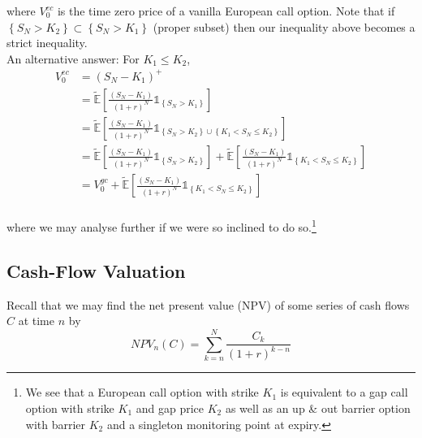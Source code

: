 \documentclass[12pt]{article}
\newlength\tindent
\renewcommand{\indent}{\hspace*{\tindent}}
\newcommand{\E}{\mathbb E}
\begin{document}
where $V^{ec}_0$ is the time zero price of a vanilla European call option. Note that if $\left\{S_N > K_2\right\} \subset \left\{S_N > K_1\right\}$ (proper subset) then our inequality above becomes a strict inequality. \\

An alternative answer: For $K_1 \leq K_2$,
\begin{align*}
	V^{ec}_0 &= (S_N - K_1)^+ \\
	&= \tilde{\E} \left[ \frac{(S_N - K_1)}{(1 + r)^N} \mathds 1_{\left\{S_N > K_1 \right\} } \right] \\
	&= \tilde{\E} \left[ \frac{(S_N - K_1)}{(1 + r)^N} \mathds 1_{\left\{S_N > K_2\right\} \cup \left\{ K_1 < S_N \leq K_2 \right\} } \right] \\
	&= \tilde{\E} \left[ \frac{(S_N - K_1)}{(1 + r)^N} \mathds 1_{\left\{S_N > K_2\right\}} \right] + \tilde{\E} \left[ \frac{(S_N - K_1)}{(1 + r)^N} \mathds 1_{ \left\{ K_1 < S_N \leq K_2 \right\} } \right] \\
	&= V^{gc}_0 + \tilde{\E} \left[ \frac{(S_N - K_1)}{(1 + r)^N} \mathds 1_{ \left\{ K_1 < S_N \leq K_2 \right\} } \right] \\
\end{align*}

where we may analyse further if we were so inclined to do so.\footnote{We see that a European call option with strike $K_1$ is equivalent to a gap call option with strike $K_1$ and gap price $K_2$ as well as an up \& out barrier option with barrier $K_2$ and a singleton monitoring point at expiry.}

\subsection{Cash-Flow Valuation}

\indent Recall that we may find the net present value (NPV) of some series of cash flows $C$ at time $n$ by
\begin{equation*}
	NPV_n(C) = \sum^N_{k = n} \frac{C_k}{(1 + r)^{k - n}}
\end{equation*}
\end{document}
